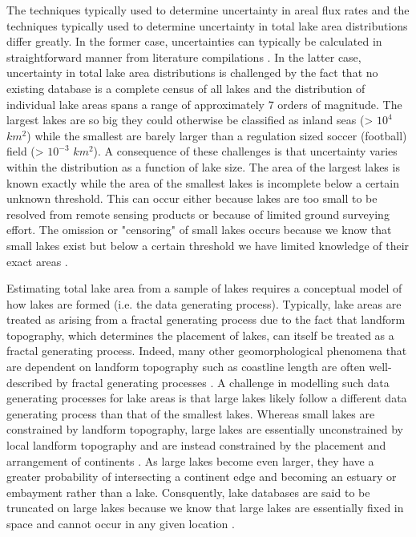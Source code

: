 \documentclass{article}
\begin{document}
The techniques typically used to determine uncertainty in areal flux rates and the techniques typically used to determine uncertainty in total lake area distributions differ greatly. In the former case, uncertainties can typically be calculated in straightforward manner from literature compilations \citep{delsontroGreenhouseGasEmissions2018, kellerGlobalCarbonBudget2021}. In the latter case, uncertainty in total lake area distributions is challenged by the fact that no existing database is a complete census of all lakes \citep{messagerEstimatingVolumeAge2016} and the distribution of individual lake areas spans a range of approximately 7 orders of magnitude. The largest lakes are so big they could otherwise be classified as inland seas (> $10^4$ $km^2$) while the smallest are barely larger than a regulation sized soccer (football) field (> $10^{-3}$ $km^2$).
A consequence of these challenges is that uncertainty varies within the distribution as a function of lake size. The area of the largest lakes is known exactly while the area of the smallest lakes is incomplete below a certain unknown threshold. This can occur either because lakes are too small to be resolved from remote sensing products or because of limited ground surveying effort. The omission or "censoring" of small lakes occurs because we know that small lakes exist but below a certain threshold we have limited knowledge of their exact areas \citep{hamiltonEstimationFractalDimension1992}.

Estimating total lake area from a sample of lakes requires a conceptual model of how lakes are formed (i.e. the data generating process). Typically, lake areas are treated as arising from a fractal generating process due to the fact that landform topography, which determines the placement of lakes, can itself be treated as a fractal generating process. Indeed, many other geomorphological phenomena that are dependent on landform topography such as coastline length are often well-described by fractal generating processes \citep{newman_power_2005}. A challenge in modelling such data generating processes for lake areas is that large lakes likely follow a different data generating process than that of the smallest lakes. Whereas small lakes are constrained by landform topography, large lakes are essentially unconstrained by local landform topography and are instead constrained by the placement and arrangement of continents \citep{goodchildLakesFractalSurfaces1988}. As large lakes become even larger, they have a greater probability of intersecting a continent edge and becoming an estuary or embayment rather than a lake. Consquently, lake databases are said to be truncated on large lakes because we know that large lakes are essentially fixed in space and cannot occur in any given location \citep{hamiltonEstimationFractalDimension1992}.
\end{document}
